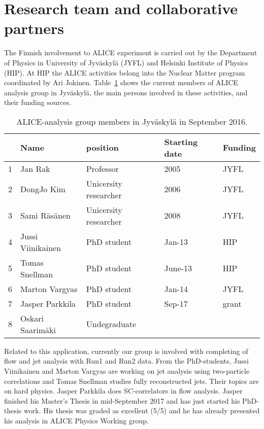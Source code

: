 
\section{Research team and collaborative partners} %
\label{sec:reseachteam}

The Finnish involvement to ALICE experiment is carried out by the Department of Physics in University of Jyv\"askyl\"a (JYFL) and Helsinki Institute of Physics (HIP). At HIP the ALICE activities belong into the Nuclear Matter program coordinated by Ari Jokinen. Table~\ref{tab:personnel} shows the current members of ALICE analysis group in Jyv\"askyl\"a, the main persons involved in these activities, and their funding sources.

\begin{table}[htp]
\caption{ALICE-analysis group members in Jyv\"askyl\"a in September 2016.}
\begin{center}
\begin{tabular}{|l|l|l|l|l|}
\hline
   &  Name                       &  position         & Starting date & Funding \\
\hline
1 &    Jan  Rak                  & Professor       &  2005           & JYFL \\
2 &    DongJo   Kim          & Unicersity researcher     &  2006 & JYFL \\
3 &    Sami   R\"as\"anen & Unicersity researcher     &  2008 & JYFL \\
 \hline
4 &    Jussi   Viinikainen   & PhD student   & Jan-13         & HIP \\
5 &    Tomas Snellman     & PhD student   & June-13       & HIP \\
6 &    Marton Vargyas      & PhD student   & Jan-14         & JYFL \\
7 &    Jasper Parkkila       & PhD student   & Sep-17         & grant \\
\hline
8 &    Oskari Saarim\"aki & Undegraduate   &          &  \\
\hline
\end{tabular}
\end{center}
\label{tab:personnel}
\end{table}%

Related to this application, currently our group is involved with completing of flow and jet analysis with Run1 and Run2 data. From the PhD-students, Jussi Viinikainen and Marton Vargyas are working on jet analysis using two-particle correlations and Tomas Snellman studies fully reconstructed jets. Their topics are on hard physics. Jasper Parkkila does SC-correlators in flow analysis. Jasper finished his Master's Thesis in mid-September 2017 and has just started his PhD-thesis work. His thesis was graded as excellent (5/5) and he has already presented his analysis in ALICE Physics Working group.


